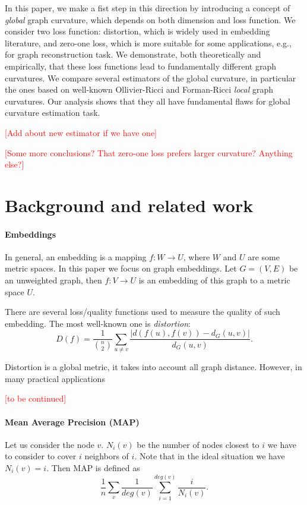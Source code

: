 \documentclass{article} %
\begin{document}
In this paper, we make a fist step in this direction by introducing a concept of \textit{global} graph curvature, which depends on both dimension and loss function. We consider two loss function: distortion, which is widely used in embedding literature, and zero-one loss, which is more suitable for some applications, e.g., for graph reconstruction task. We demonstrate, both theoretically and empirically, that these loss functions lead to fundamentally different graph curvatures. We compare several estimators of the global curvature, in particular the ones based on well-known Ollivier-Ricci and Forman-Ricci \textit{local} graph curvatures. Our analysis shows that they all have fundamental flaws for global curvature estimation task. 

\textcolor{red}{[Add about new estimator if we have one]}

\textcolor{red}{[Some more conclusions? That zero-one loss prefers larger curvature? Anything else?]}

\section{Background and related work}\label{sec:related_work}

\paragraph{Embeddings} 
In general, an embedding is a mapping $f: W \rightarrow U$, where $W$ and $U$ are some metric spaces. In this paper we focus on graph embeddings. Let $G = (V,E)$ be an unweighted graph, then $f: V \rightarrow U$ is an embedding of this graph to a metric space $U$. 

There are several loss/quality functions used to measure the quality of such embedding. The most well-known one is \textit{distortion}:
\[
D(f) = \frac{1}{\binom{n}{2}} \sum_{u \neq v}  \frac{|d(f(u),f(v)) - d_G(u,v)|}{d_G(u,v)}.
\]

Distortion is a global metric, it takes into account all graph distance. However, in many practical applications 

\textcolor{red}{[to be continued]}

\iffalse

\paragraph{Mean Average Precision (MAP)}

Let us consider the node $v$. $N_i(v)$ be the number of nodes closest to $i$ we have to consider to cover $i$ neighbors of $i$. Note that in the ideal situation we have $N_i(v) = i$. Then MAP is defined as 
\[
\frac{1}{n} \sum_v \frac{1}{deg(v)} \sum_{i=1}^{deg(v)} \frac{i}{N_i(v)}. 
\]
\end{document}
